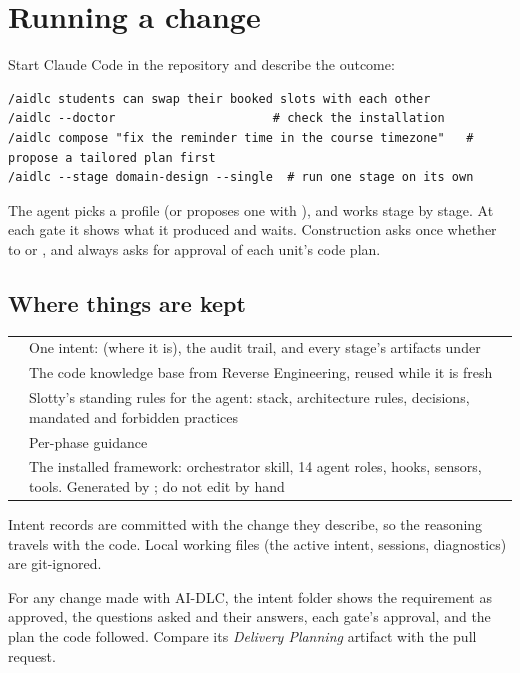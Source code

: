 \section{Running a change}
Start Claude Code in the repository and describe the outcome:
\begin{lstlisting}
/aidlc students can swap their booked slots with each other
/aidlc --doctor                      # check the installation
/aidlc compose "fix the reminder time in the course timezone"   # propose a tailored plan first
/aidlc --stage domain-design --single  # run one stage on its own
\end{lstlisting}
The agent picks a profile (or proposes one with ), and works stage by stage. At each
gate it shows what it produced and waits. Construction asks once whether to  or , and always asks for approval of each unit's code plan.

\subsection{Where things are kept}
\begin{xltabular}{\linewidth}{@{}P{58mm} L@{}}
  \toprule
   & \\
  \midrule
   & One intent:  (where it is), the audit trail, and every stage's artifacts under \\
   & The code knowledge base from Reverse Engineering, reused while it is fresh\\
   & Slotty's standing rules for the agent: stack, architecture rules, decisions, mandated and forbidden practices\\
   & Per-phase guidance\\
   & The installed framework: orchestrator skill, 14 agent roles, hooks, sensors, tools. Generated by ; do not edit by hand\\
  \bottomrule
\end{xltabular}
Intent records are committed with the change they describe, so the reasoning travels with the
code. Local working files (the active intent, sessions, diagnostics) are git-ignored.

\begin{auditnote}
  For any change made with AI-DLC, the intent folder shows the requirement as approved, the
  questions asked and their answers, each gate's approval, and the plan the code followed. Compare
  its \emph{Delivery Planning} artifact with the pull request.
\end{auditnote}

